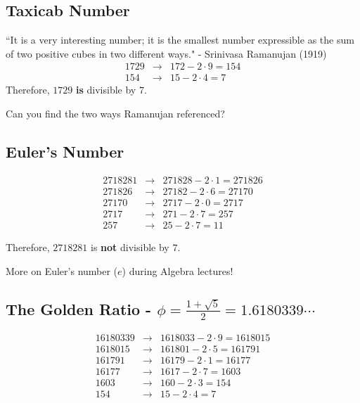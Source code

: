 \subsection*{Taxicab Number}

``It is a very interesting number; it is the smallest number expressible as the sum of two positive cubes in two different ways." -  Srinivasa Ramanujan (1919)
\begin{eqnarray*}
	1729 &\to& 172-2\cdot 9=154 \\ 
	154 &\to& 15-2\cdot 4=7
\end{eqnarray*}
Therefore, $1729$ \textbf{is} divisible by $7$.

Can you find the two ways Ramanujan referenced?  

\clearpage

\subsection*{Euler's Number}

\begin{eqnarray*}  
	2718281 &\to& 271828-2\cdot 1=271826 \\ 
	271826 &\to& 27182-2\cdot 6=27170 \\
	27170 &\to& 2717-2\cdot 0=2717 \\ 2717 &\to& 271-2\cdot 7=257 \\ 257 &\to& 25-2\cdot 7=11
\end{eqnarray*}

Therefore, $2718281$ is \textbf{not} divisible by $7$.

More on Euler's number ($e$) during Algebra lectures!  

\clearpage

\subsection*{The Golden Ratio - $\phi=\frac{1+\sqrt{5}}{2}=1.6180339\cdots$}

\begin{eqnarray*}
	16180339 &\to& 1618033-2\cdot 9=1618015 \\ 1618015 &\to& 161801-2\cdot 5=161791 \\ 161791 &\to& 16179-2\cdot 1=16177 \\ 16177 &\to& 1617-2\cdot 7=1603 \\ 1603 &\to& 160-2\cdot 3=154 \\ 154 &\to& 15-2\cdot 4=7
\end{eqnarray*}  

